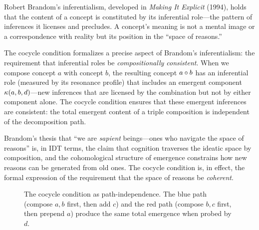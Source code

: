 \begin{interpretation}\label{interp:ch2:brandom_inferentialism}
Robert Brandom's inferentialism, developed in \emph{Making It Explicit}
(1994), holds that the content of a concept is constituted by its
inferential role---the pattern of inferences it licenses and precludes.
A concept's meaning is not a mental image or a correspondence with
reality but its position in the ``space of reasons.''

The cocycle condition formalizes a precise aspect of Brandom's
inferentialism: the requirement that inferential roles be
\emph{compositionally consistent}. When we compose concept $a$ with
concept $b$, the resulting concept $a \circ b$ has an inferential
role (measured by its resonance profile) that includes an emergent
component $\kappa(a, b, d)$---new inferences that are licensed by
the combination but not by either component alone. The cocycle
condition ensures that these emergent inferences are consistent:
the total emergent content of a triple composition is independent
of the decomposition path.

Brandom's thesis that ``we are \emph{sapient} beings---ones who
navigate the space of reasons'' is, in IDT terms, the claim that
cognition traverses the ideatic space by composition, and the
cohomological structure of emergence constrains how new reasons
can be generated from old ones. The cocycle condition is, in effect,
the formal expression of the requirement that the space of reasons
be \emph{coherent}.
\end{interpretation}

\begin{figure}[ht]
\centering
{}
\caption{The cocycle condition as path-independence. The blue path
(compose $a,b$ first, then add $c$) and the red path (compose $b,c$
first, then prepend $a$) produce the same total emergence when probed
by $d$.}
\label{fig:cocycle-paths}
\end{figure}

